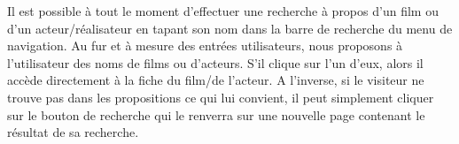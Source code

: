             Il est possible à tout le moment d'effectuer une recherche à propos d'un film ou d'un acteur/réalisateur en tapant son nom dans la barre de recherche du menu de navigation. Au fur et à mesure des entrées utilisateurs, nous proposons à l'utilisateur des noms de films ou d'acteurs. S'il clique sur l'un d'eux, alors il accède directement à la fiche du film/de l'acteur. A l'inverse, si le visiteur ne trouve pas dans les propositions ce qui lui convient, il peut simplement cliquer sur le bouton de recherche qui le renverra sur une nouvelle page contenant le résultat de sa recherche.

